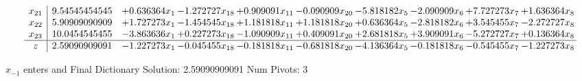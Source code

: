 \documentclass[10pt]{article}
\begin{document}
\[\begin{array}{c| c c@{\hskip 2pt} c@{\hskip 2pt} c@{\hskip 2pt} c@{\hskip 2pt} c@{\hskip 2pt} c@{\hskip 2pt} c@{\hskip 2pt} c@{\hskip 2pt} }
 x_{21}   &  9.54545454545 & + 0.636364 x_{1} & -1.272727 x_{18} & + 0.909091 x_{11} & -0.090909 x_{20} & -5.818182 x_{5} & -2.090909 x_{6} & + 7.727273 x_{7} & + 1.636364 x_{8}\\
 x_{22}   &  5.90909090909 & + 1.727273 x_{1} & -1.454545 x_{18} & + 1.181818 x_{11} & + 1.181818 x_{20} & + 0.636364 x_{5} & -2.818182 x_{6} & + 3.545455 x_{7} & -2.272727 x_{8}\\
 x_{23}   &  10.0454545455 & -3.863636 x_{1} & + 0.227273 x_{18} & -1.090909 x_{11} & + 0.409091 x_{20} & + 2.681818 x_{5} & + 3.909091 x_{6} & -5.272727 x_{7} & + 0.136364 x_{8}\\
\hline
z    &  2.59090909091 & -1.227273 x_{1} & -0.045455 x_{18} & -0.181818 x_{11} & -0.681818 x_{20} & -4.136364 x_{5} & -0.181818 x_{6} & -0.545455 x_{7} & -1.227273 x_{8}\\
\end{array}\]


 $ x_{-1} $ enters and Final Dictionary
Solution:  2.59090909091
Num Pivots:  3
\end{document}
